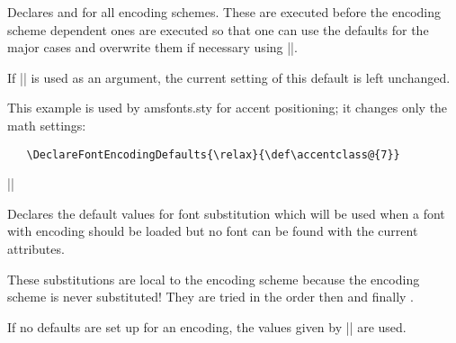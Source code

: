 \documentclass{ltxguide}[1995/11/28]
\begin{document}
Declares  and  for all encoding
schemes.  These are executed before the encoding scheme dependent ones
are executed so that one can use the defaults for the major cases and
overwrite them if necessary using |\DeclareFontEncoding|.
 
If |\relax| is used as an argument, the current setting of this default
is left unchanged.
 
This example is used by amsfonts.sty for accent positioning; it changes
only the math settings:
\begin{verbatim}
   \DeclareFontEncodingDefaults{\relax}{\def\accentclass@{7}}
\end{verbatim}
 
 
\begin{decl}
|\DeclareFontSubstitution|    
\end{decl}
 
Declares the default values for font substitution which will be used
when a font with encoding 
should be loaded but no font can be found with the current
attributes.
 
These substitutions are local to the encoding scheme because the
encoding scheme is never substituted!  They are tried in the order
 then   and finally .
 
If no defaults are set up for an encoding, the values given by
|\DeclareErrorFont| are used.
 
\end{document}
